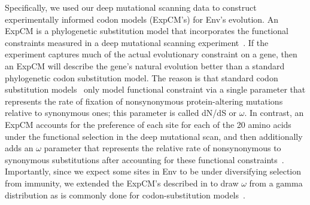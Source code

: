\documentclass[9pt]{elife}
\begin{document}
Specifically, we used our deep mutational scanning data to construct experimentally informed codon models (ExpCM's) for Env's evolution.
An ExpCM is a phylogenetic substitution model that incorporates the functional constraints measured in a deep mutational scanning experiment~\citep{hilton2017phydms}.
If the experiment captures much of the actual evolutionary constraint on a gene, then an ExpCM will describe the gene's natural evolution better than a standard phylogenetic codon substitution model.
The reason is that standard codon substitution models~\citep[such as the commonly used Goldman-Yang style models;][]{yang2000codon} only model functional constraint via a single parameter that represents the rate of fixation of nonsynonymous protein-altering mutations relative to synonymous ones; this parameter is called dN/dS or $\omega$.
In contrast, an ExpCM accounts for the preference of each site for each of the 20 amino acids under the functional selection in the deep mutational scan, and then additionally adds an $\omega$ parameter that represents the relative rate of nonsynonymous to synonymous substitutions after accounting for these functional constraints~\citep{bloom2017identification,hilton2017phydms}.
Importantly, since we expect some sites in Env to be under diversifying selection from immunity, we extended the ExpCM's described in \citet{hilton2017phydms} to draw $\omega$ from a gamma distribution as is commonly done for codon-substitution models~\citep{yang2000codon}.
\end{document}
